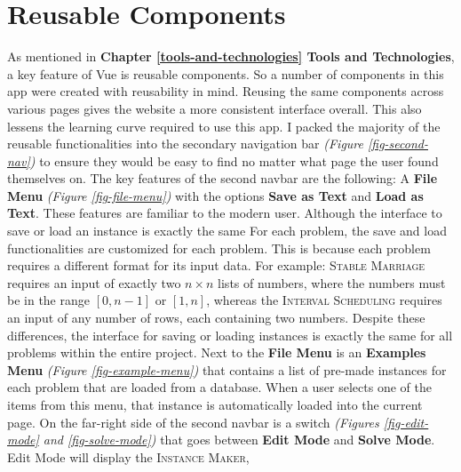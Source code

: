 \section{Reusable Components}
As mentioned in \textbf{Chapter \ref{tools-and-technologies} Tools and Technologies}, 
a key feature of Vue is reusable components. So a number of components in this app 
were created with reusability in mind. 
Reusing the same components across various pages gives the website 
a more consistent interface overall. 
This also lessens the learning curve required to use this app.
I packed the majority of the reusable functionalities into the secondary 
navigation bar \textit{(Figure \ref{fig-second-nav})} 
to ensure they would be easy to find no matter what page the 
user found themselves on. 
The key features of the second navbar are the following: 
\newline\newline
A \textbf{File Menu} \textit{(Figure \ref{fig-file-menu})} 
with the options \textbf{Save as Text} and \textbf{Load as Text}. 
These features are familiar to the modern user. 
Although the interface to save or load an instance is exactly the same For each problem,
the save and load functionalities are customized for each problem. 
This is because each problem requires a different format for its input data.
\newline\newline
For example: \textsc{Stable Marriage} requires an input of exactly two $n\times n$
lists of numbers, where the numbers 
must be in the range $[0, n-1]$ or $[1, n]$, 
whereas the \textsc{Interval Scheduling} 
requires an input of any number of rows, each containing two numbers.
Despite these differences, the interface for saving or loading instances 
is exactly the same for all problems within the entire project. 
\newline\newline
Next to the \textbf{File Menu} is an \textbf{Examples Menu} \textit{(Figure \ref{fig-example-menu})} 
that contains a list of 
pre-made instances for each problem that are loaded from a database.
When a user selects one of the items from this menu, 
that instance is automatically loaded into the current page. 
\newline\newline
On the far-right side of the second navbar is a switch 
\textit{(Figures \ref{fig-edit-mode} and \ref{fig-solve-mode})} 
that goes between \textbf{Edit Mode} and \textbf{Solve Mode}. 
Edit Mode will display the \textsc{Instance Maker},
